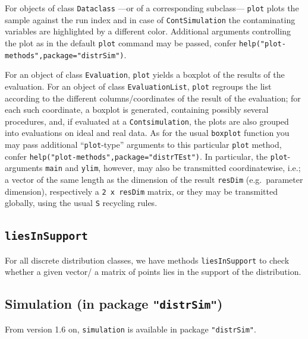 \documentclass[11pt]{article}
\newcommand{\code}[1]{{\tt #1}}
\newcommand{\pkg}[1]{{\tt "#1"}}
\begin{document}
\par
For objects of  class \code{Dataclass} ---or of a corresponding subclass---
 \code{plot} plots the sample against the run index and in case  of
 \code{ContSimulation} the contaminating variables are highlighted by a
 different color. Additional arguments controlling
 the plot as in the default \code{plot} command may be passed,
 confer \code{help("plot-methods",package="distrSim")}.
 \par
 For an object of class \code{Evaluation},
\code{plot} yields a boxplot of the results of the evaluation.
For an object of class \code{EvaluationList},
\code{plot} regroups the list according to the different columns/coordinates of
the result of the evaluation; for each such coordinate, a boxplot is generated,
containing possibly several procedures, and, if evaluated at a
\code{Contsimulation}, the plots are also grouped into evaluations on ideal and
real data. As for the usual \code{boxplot} function you may pass additional
``\code{plot}-type'' arguments to this particular \code{plot} method, confer
\code{help("plot-methods",package="distrTEst")}. In particular, the
\code{plot}-arguments \code{main} and \code{ylim}, however, may also be
transmitted coordinatewise, i.e.; a vector of the same length as the dimension
of the result {\tt resDim} (e.g.\ parameter dimension), respectively a
{\tt 2 x resDim} matrix, or they may be transmitted globally, using the
usual {\tt S} recycling rules.
\subsection[liesInSupport]{\code{liesInSupport}}
For all discrete distribution classes, we have methods \code{liesInSupport} to
check whether a given vector/ a matrix of points lies in the support of the
distribution.

\subsection[Simulation (in package distrSim)]%
{Simulation (in package \pkg{distrSim})}
%
From version 1.6 on, \code{simulation} is available in package  \pkg{distrSim}.
\end{document}

